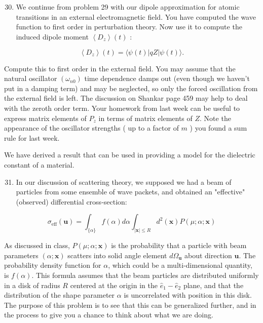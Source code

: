\documentclass[12pt]{article}
\begin{document}
\section{}
\begin{enumerate}
  \setcounter{enumi}{29}
  \item We continue from problem 29 with our dipole approximation for atomic transitions in an external electromagnetic field. You have computed the wave function to first order in perturbation theory. Now use it to compute the induced dipole moment $\left\langle D_{z}\right\rangle(t)$ :
\end{enumerate}


\begin{equation*}
\left\langle D_{z}\right\rangle(t)=\langle\psi(t)|q Z| \psi(t)\rangle . \tag{2}
\end{equation*}


Compute this to first order in the external field. You may assume that the natural oscillator $\left(\omega_{n 0}\right)$ time dependence damps out (even though we haven't put in a damping term) and may be neglected, so only the forced oscillation from the external field is left. The discussion on Shankar page 459 may help to deal with the zeroth order term. Your homework from last week can be useful to express matrix elements of $P_{z}$ in terms of matrix elements of $Z$. Note the appearance of the oscillator strengths ( up to a factor of $m$ ) you found a sum rule for last week.

We have derived a result that can be used in providing a model for the dielectric constant of a material.

\begin{enumerate}
  \setcounter{enumi}{30}
  \item In our discussion of scattering theory, we supposed we had a beam of particles from some ensemble of wave packets, and obtained an "effective" (observed) differential cross-section:
\end{enumerate}


\begin{equation*}
\sigma_{\mathrm{eff}}(\mathbf{u})=\int_{\{\alpha\}} f(\alpha) d \alpha \int_{|\mathbf{x}| \leq R} d^{2}(\mathbf{x}) P(\mu ; \alpha ; \mathbf{x}) \tag{3}
\end{equation*}


As discussed in class, $P(\mu ; \alpha ; \mathbf{x})$ is the probability that a particle with beam parameters $(\alpha ; \mathbf{x})$ scatters into solid angle element $d \Omega_{\mathbf{u}}$ about direction $\mathbf{u}$. The probability density function for $\alpha$, which could be a multi-dimensional quantity, is $f(\alpha)$. This formula assumes that the beam particles are distributed uniformly in a disk of radius $R$ centered at the origin in the $\hat{e}_{1}-\hat{e}_{2}$ plane, and that the distribution of the shape parameter $\alpha$ is uncorrelated with position in this disk. The purpose of this problem is to see that this can be generalized further, and in the process to give you a chance to think about what we are doing.
\end{document}
